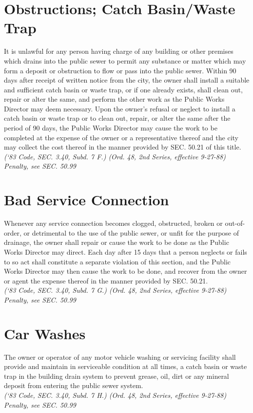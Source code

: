 \section{Obstructions; Catch Basin/Waste Trap}
It is unlawful for any person having charge of any building or other premises which drains into the public sewer to permit any substance or matter which may form a deposit or obstruction to flow or pass into the public sewer.  Within 90 days after receipt of written notice from the city, the owner shall install a suitable and sufficient catch basin or waste trap, or if one already exists, shall clean out, repair or alter the same, and perform the other work as the Public Works Director may deem necessary.  Upon the owner’s refusal or neglect to install a catch basin or waste trap or to clean out, repair, or alter the same after the period of 90 days, the Public Works Director may cause the work to be completed at the expense of the owner or a representative thereof and the city may collect the cost thereof in the manner provided by SEC. 50.21 of this title.\\
\emph{(‘83 Code, SEC. 3.40, Subd. 7 F.) (Ord. 48, 2nd Series, effective 9-27-88)}\\
\emph{Penalty, see SEC. 50.99}
\section{Bad Service Connection}
Whenever any service connection becomes clogged, obstructed, broken or out-of-order, or detrimental to the use of the public sewer, or unfit for the purpose of drainage, the owner shall repair or cause the work to be done as the Public Works Director may direct.  Each day after 15 days that a person neglects or fails to so act shall constitute a separate violation of this section, and the Public Works Director may then cause the work to be done, and recover from the owner or agent the expense thereof in the manner provided by SEC. 50.21.\\
\emph{(‘83 Code, SEC. 3.40, Subd. 7 G.) (Ord. 48, 2nd Series, effective 9-27-88)}\\
\emph{Penalty, see SEC. 50.99}
\section{Car Washes}
The owner or operator of any motor vehicle washing or servicing facility shall provide and maintain in serviceable condition at all times, a catch basin or waste trap in the building drain system to prevent grease, oil, dirt or any mineral deposit from entering the public sewer system.\\
\emph{(‘83 Code, SEC. 3.40, Subd. 7 H.) (Ord. 48, 2nd Series, effective 9-27-88)}\\
\emph{Penalty, see SEC. 50.99}


